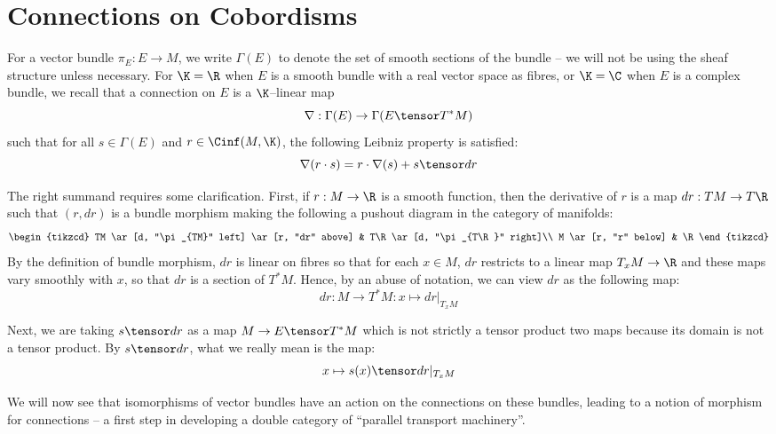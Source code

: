 \documentclass[\PRJWD/Thick_TQFTs_and_Quantum_Information.tex]{subfiles}
\begin{document}
\section{Connections on Cobordisms}

For a vector bundle $\pi_E : E \to M$, we write $\Gamma(E)$ to denote the set of
smooth sections of the bundle -- we will not be using the sheaf structure unless
necessary. For $\K = \R$ when $E$ is a smooth bundle with a real vector space as
fibres, or $\K = \C$ when $E$ is a complex bundle, we recall that a connection
\cite{Conn} on $E$ is a $\K$--linear map
\[
  \nabla : \Gamma(E) \to \Gamma(E \tensor T^*M)
\]
such that for all $s \in \Gamma(E)$ and $r \in \Cinf(M, \K)$, the following
Leibniz property is satisfied:
\[
  \nabla(r \cdot s) = r \cdot \nabla(s) + s \tensor dr
\]

The right summand requires some clarification.
First, if $r : M \to \R$ is a smooth function, then the derivative of $r$ is a
map $dr : TM \to T\R$ such that $(r, dr)$ is a bundle morphism making the
following a pushout diagram in the category of manifolds:
\[\begin{tikzcd}
TM \ar[d, "\pi_{TM}" left] \ar[r, "dr" above] & T\R \ar[d, "\pi_{T\R}" right]\\
M \ar[r, "r" below] & \R
\end{tikzcd}\]
By the definition of bundle morphism, $dr$ is linear on fibres so that for each
$x \in M$, $dr$ restricts to a linear map $T_xM \to \R$ and these maps vary
smoothly with $x$, so that $dr$ is a section of $T^*M$. Hence, by an abuse of
notation, we can view $dr$ as the following map:
\[
  dr : M \to T^*M : x \mapsto dr|_{T_xM}
\]

Next, we are taking $s \tensor dr$ as a map $M \to E \tensor T^*M$ which is not
strictly a tensor product two maps because its domain is not a tensor product.
By $s \tensor dr$, what we really mean is the map:
\begin{equation}\label{eqn:conn_tensor}
  x \mapsto s(x) \tensor dr|_{T_xM}
\end{equation}

We will now see that isomorphisms of vector bundles have an action on the
connections on these bundles, leading to a notion of morphism for connections --
a first step in developing a double category of
``parallel transport machinery''.






\end{document}
